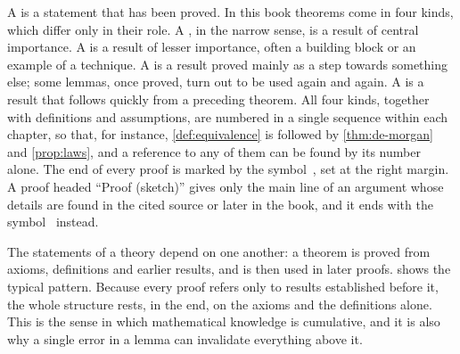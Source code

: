 A  is a statement that has been proved. In this book theorems come in four kinds, which differ only in their role. A , in the narrow sense, is a result of central importance. A  is a result of lesser importance, often a building block or an example of a technique. A  is a result proved mainly as a step towards something else; some lemmas, once proved, turn out to be used again and again. A  is a result that follows quickly from a preceding theorem. All four kinds, together with definitions and assumptions, are numbered in a single sequence within each chapter, so that, for instance, \cref{def:equivalence} is followed by \cref{thm:de-morgan} and \cref{prop:laws}, and a reference to any of them can be found by its number alone. The end of every proof is marked by the symbol~\qedsymbol, set at the right margin. A proof headed ``Proof (sketch)'' gives only the main line of an argument whose details are found in the cited source or later in the book, and it ends with the symbol~\sketchsymbol{} instead.

The statements of a theory depend on one another: a theorem is proved from axioms, definitions and earlier results, and is then used in later proofs.  shows the typical pattern. Because every proof refers only to results established before it, the whole structure rests, in the end, on the axioms and the definitions alone. This is the sense in which mathematical knowledge is cumulative, and it is also why a single error in a lemma can invalidate everything above it.

\begin{figure}
\end{figure}

